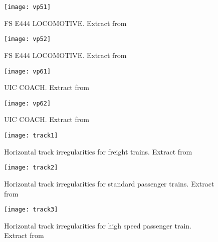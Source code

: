\begin{appendices}
\begin{figure}[h]
    \centering
    \texttt{[image: vp51]}
    \caption{FS E444 LOCOMOTIVE. Extract from \citet[Appendix 2]{d181dt329}}
\end{figure}

\begin{figure}[h]
    \centering
    \texttt{[image: vp52]}
    \caption{FS E444 LOCOMOTIVE. Extract from \citet[Appendix 2]{d181dt329}}
\end{figure}

\begin{figure}[h]
    \centering
    \texttt{[image: vp61]}
    \caption{UIC COACH. Extract from \citet[Appendix 2]{d181dt329}}
    \label{fig:uicoach}
\end{figure}

\begin{figure}[h]
    \centering
    \texttt{[image: vp62]}
    \caption{UIC COACH. Extract from \citet[Appendix 2]{d181dt329}}
\end{figure}

\begin{figure}[h]    \centering
    \texttt{[image: track1]}
    \caption{Horizontal track irregularities for freight trains. Extract from \citet[Figure 2.1]{d181}}
    \label{fig:track1}
\end{figure}

\begin{figure}[h]
    \centering
    \texttt{[image: track2]}
    \caption{Horizontal track irregularities for standard passenger trains. Extract from \citet[Figure 2.1]{d181}}
\end{figure}

\begin{figure}[h]
    \centering
    \texttt{[image: track3]}
    \caption{Horizontal track irregularities for high speed passenger train. Extract from \citet[Figure 2.1]{d181}}
    \label{fig:track3}
\end{figure}


\end{appendices}
